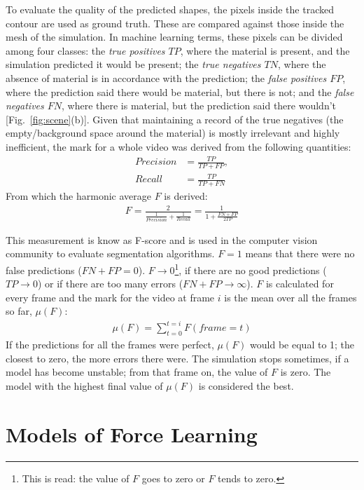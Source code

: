 \documentclass[journal]{IEEEtran}
\newcommand{\fref}[1]{Fig.~\ref{#1}}
\newcounter{algorithm}
\newcommand{\comment}[1]{{\color{red} #1}}
\begin{document}
To evaluate the quality of the predicted shapes, the pixels inside the tracked contour are used as ground truth.  These are  compared against those inside the mesh of the simulation.  In machine learning terms, these pixels can be divided among four classes: the \textit{true positives $TP$}, where the material is present, and the simulation predicted it would be present; the \textit{true negatives $TN$}, where the absence of material is in accordance with the prediction; the \textit{false positives $FP$}, where the prediction said there would be material, but there is not; and the \textit{false negatives $FN$}, where there is material, but the prediction said there wouldn't [\fref{fig:scene}(b)].  Given that maintaining a record of the true negatives (the empty/background space around the material) is mostly irrelevant and highly inefficient, the mark for a whole video was derived from the following quantities:
\begin{align}
 Precision &= \frac{TP}{TP+FP}, \\
 Recall &= \frac{TP}{TP+FN}
\end{align}
From which the harmonic average $F$ is derived:
\begin{align}
 F = \frac{2}{\frac{1}{Precision} + \frac{1}{Recall}} = \frac{1}{1 + \frac{FN + FP}{2TP}}
\end{align}

This measurement \comment{is know as F-score and} is used in the computer vision community to evaluate segmentation algorithms.  $F=1$ means that there were no false predictions ($FN+FP = 0$).  $F \rightarrow 0$\footnote{This is read: the value of $F$ goes to zero or $F$ tends to zero.}, if there are no good predictions ($TP\rightarrow0$) or if there are too many errors ($FN+FP \rightarrow \infty$).  $F$ is calculated for every frame and the mark for the video \comment{ at frame $i$} is the mean over all the frames so far, $\mu(F)$:
\comment{\begin{align}
 \mu(F) = \sum_{t=0}^{t=i} F(frame=t)
\end{align}}
If the predictions for all the frames were perfect, $\mu(F)$ would be equal to 1; the closest to zero, the more errors there were.  The simulation stops sometimes, if a model has become unstable; from that frame on, the value of $F$ is zero.  The model with the highest final value of $\mu(F)$ is considered the best.

\section{Models of Force Learning}
\label{sec:forces}
\end{document}
